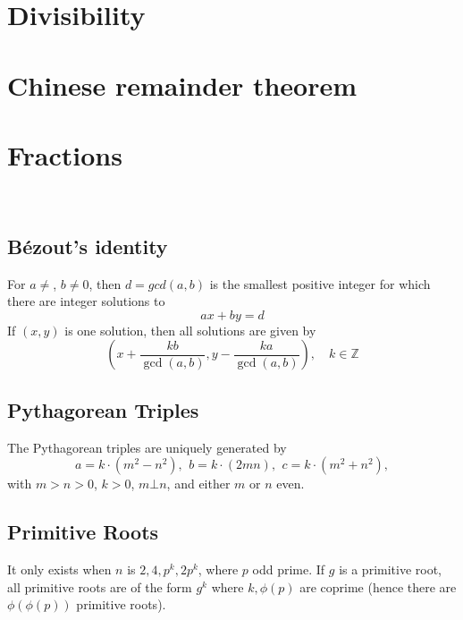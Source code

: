 \section{Divisibility}

\section{Chinese remainder theorem}

\section{Fractions}

\


\subsection{Bézout's identity}
For $a \neq $, $b \neq 0$, then $d=gcd(a,b)$ is the smallest positive integer for which there are integer solutions to
$$ax+by=d$$
If $(x,y)$ is one solution, then all solutions are given by
$$\left(x+\frac{kb}{\gcd(a,b)}, y-\frac{ka}{\gcd(a,b)}\right), \quad k\in\mathbb{Z}$$

\subsection{Pythagorean Triples}
 The Pythagorean triples are uniquely generated by
 \[ a=k\cdot (m^{2}-n^{2}),\ \,b=k\cdot (2mn),\ \,c=k\cdot (m^{2}+n^{2}), \]
 with $m > n > 0$, $k > 0$, $m \bot n$, and either $m$ or $n$ even.

\subsection{Primitive Roots}
	It only exists when $n$ is $2, 4, p^k, 2p^k$, where $p$ odd prime.
	If $g$ is a primitive root, all primitive roots are of the form $g^k$
	where $k,\phi(p)$ are coprime (hence there are $\phi(\phi(p))$ primitive roots).

